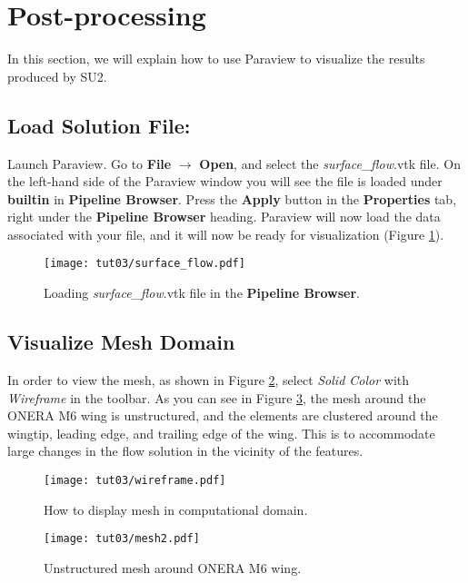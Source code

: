\section{Post-processing}
In this section, we will explain how to use Paraview to visualize the results produced by SU2. 
\subsection{Load Solution File:}
Launch Paraview. Go to \textbf{File} $\rightarrow$ \textbf{Open}, and select the \textit{surface\_flow}.vtk file. On the left-hand side of the Paraview window you will see the file is loaded under \textbf{builtin} in \textbf{Pipeline Browser}. Press the \textbf{Apply} button in the \textbf{Properties} tab, right under the \textbf{Pipeline Browser} heading. Paraview will now load the data associated with your file, and it will now be ready for visualization (Figure \ref{fig3:load}).
\begin{figure}[htbp]
    \centering
    \texttt{[image: tut03/surface\_flow.pdf]}
    \caption{Loading \textit{surface\_flow}.vtk file in the \textbf{Pipeline Browser}.}
    \label{fig3:load}
\end{figure}
\subsection{Visualize Mesh Domain}
In order to view the mesh, as shown in Figure \ref{fig3:wireframe}, select \textit{Solid Color} with \textit{Wireframe} in the toolbar. As you can see in Figure \ref{fig3:mesh}, the mesh around the ONERA M6 wing is unstructured, and the elements are clustered around the wingtip, leading edge, and trailing edge of the wing. This is to accommodate large changes in the flow solution in the vicinity of the features.
\begin{figure}[htbp]
    \centering
    \texttt{[image: tut03/wireframe.pdf]}
    \caption{How to display mesh in computational domain.}
    \label{fig3:wireframe}
\end{figure}
\begin{figure}[htbp]
    \centering
    \texttt{[image: tut03/mesh2.pdf]}
    \caption{Unstructured mesh around ONERA M6 wing.}
    \label{fig3:mesh}
\end{figure}
